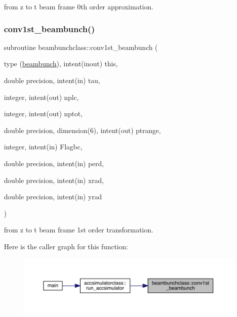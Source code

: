 from z to t beam frame 0th order approximation. 

\mbox{\label{namespacebeambunchclass_a0b46fd8b4c41577688761ad62175772b}} 
\subsubsection{\texorpdfstring{conv1st\_beambunch()}{conv1st\_beambunch()}}
{\footnotesize\ttfamily subroutine beambunchclass\+::conv1st\+\_\+beambunch (\begin{DoxyParamCaption}\item[{type (\mbox{\hyperlink{namespacebeambunchclass_structbeambunchclass_1_1beambunch}{beambunch}}), intent(inout)}]{this,  }\item[{double precision, intent(in)}]{tau,  }\item[{integer, intent(out)}]{nplc,  }\item[{integer, intent(out)}]{nptot,  }\item[{double precision, dimension(6), intent(out)}]{ptrange,  }\item[{integer, intent(in)}]{Flagbc,  }\item[{double precision, intent(in)}]{perd,  }\item[{double precision, intent(in)}]{xrad,  }\item[{double precision, intent(in)}]{yrad }\end{DoxyParamCaption})}



from z to t beam frame 1st order transformation. 

Here is the caller graph for this function\+:\nopagebreak
\begin{figure}[H]
\begin{center}
\leavevmode
\includegraphics[width=350pt]{namespacebeambunchclass_a0b46fd8b4c41577688761ad62175772b_icgraph}
\end{center}
\end{figure}
\mbox{\label{namespacebeambunchclass_ad12625a90fb4a096ff15ba55f655b148}} 
